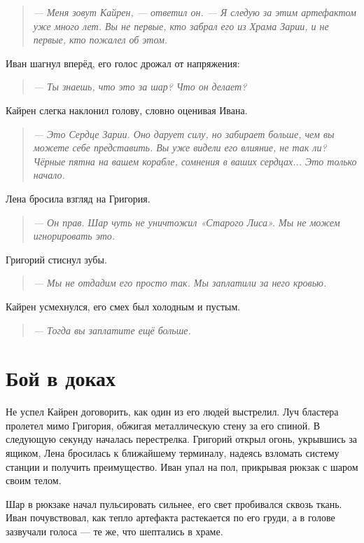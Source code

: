 \documentclass[12pt,a4paper]{book}
\newenvironment{dialogue}{\begin{quote}\itshape}{\end{quote}}
\begin{document}
\begin{dialogue}
--- Меня зовут Кайрен, --- ответил он. --- Я следую за этим артефактом уже много лет. Вы не первые, кто забрал его из Храма Зарии, и не первые, кто пожалел об этом.
\end{dialogue}

Иван шагнул вперёд, его голос дрожал от напряжения:

\begin{dialogue}
--- Ты знаешь, что это за шар? Что он делает?
\end{dialogue}

Кайрен слегка наклонил голову, словно оценивая Ивана.

\begin{dialogue}
--- Это Сердце Зарии. Оно дарует силу, но забирает больше, чем вы можете себе представить. Вы уже видели его влияние, не так ли? Чёрные пятна на вашем корабле, сомнения в ваших сердцах... Это только начало.
\end{dialogue}

Лена бросила взгляд на Григория.

\begin{dialogue}
--- Он прав. Шар чуть не уничтожил «Старого Лиса». Мы не можем игнорировать это.
\end{dialogue}

Григорий стиснул зубы.

\begin{dialogue}
--- Мы не отдадим его просто так. Мы заплатили за него кровью.
\end{dialogue}

Кайрен усмехнулся, его смех был холодным и пустым.

\begin{dialogue}
--- Тогда вы заплатите ещё больше.
\end{dialogue}

\section*{Бой в доках}

Не успел Кайрен договорить, как один из его людей выстрелил. Луч бластера пролетел мимо Григория, обжигая металлическую стену за его спиной. В следующую секунду началась перестрелка. Григорий открыл огонь, укрывшись за ящиком, Лена бросилась к ближайшему терминалу, надеясь взломать систему станции и получить преимущество. Иван упал на пол, прикрывая рюкзак с шаром своим телом.

Шар в рюкзаке начал пульсировать сильнее, его свет пробивался сквозь ткань. Иван почувствовал, как тепло артефакта растекается по его груди, а в голове зазвучали голоса --- те же, что шептались в храме.
\end{document}

